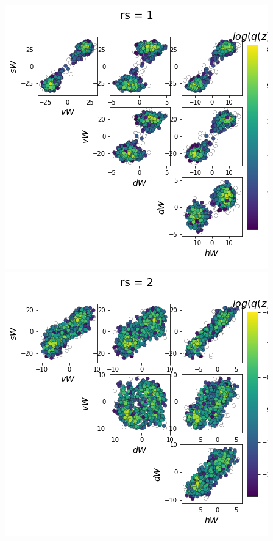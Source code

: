 \documentclass[11pt]{article}
\begin{document}
\begin{center}
\includegraphics[scale=0.33]{figs/Z_SC_reduced_c=15_p=50_rs=1.png}
\includegraphics[scale=0.33]{figs/Z_SC_reduced_c=15_p=50_rs=2.png}

\end{center}
\end{document}
